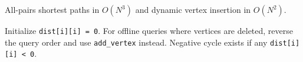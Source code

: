 
All-pairs shortest paths in $O(N^3)$ and dynamic vertex insertion in $O(N^2)$.



Initialize \lstinline|dist[i][i] = 0|. For offline queries where vertices are deleted, reverse the query order and use \lstinline|add_vertex| instead. Negative cycle exists if any \lstinline|dist[i][i] < 0|.
